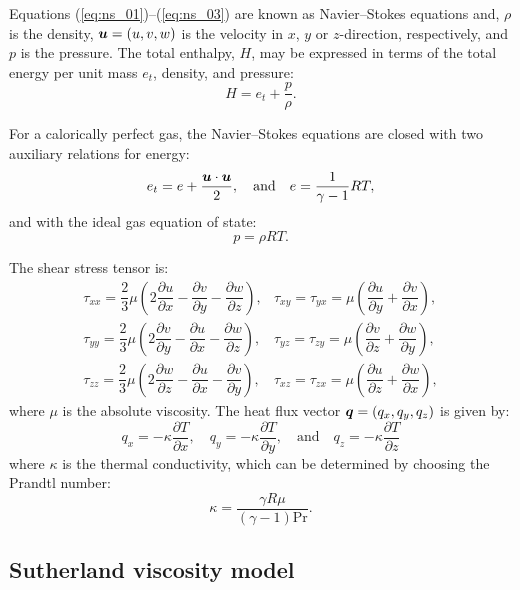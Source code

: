 \documentclass[10pt]{article}
\newcommand{\diff}[2] {\dfrac{\partial #1}{\partial #2}}
\newcommand{\bv}[1]{\ensuremath{\mbox{\boldmath$ #1 $}}}
\begin{document}
Equations (\ref{eq:ns_01})--(\ref{eq:ns_03}) are known as Navier--Stokes equations and, $\rho$ is the density, $\bv{u}=(u,v,w)$ is the velocity in $x$, $y$ or $z$-direction, respectively,    and $p$ is the pressure. The total enthalpy, $H$, may be expressed in terms of the total energy per unit mass $e_t$, density, and pressure:
$$H = e_t + \dfrac{p}{\rho}.$$ 

For a calorically perfect gas, the Navier--Stokes equations are closed with two auxiliary relations for energy:
\begin{equation}
 \label{eq:ns_04}
e_t= e+\dfrac{\bv{u}\cdot \bv{u}}{2},\quad\mbox{and}\quad e=\dfrac{1}{\gamma -1}RT ,
\end{equation}
and with the ideal gas equation of state:
\begin{equation}
 \label{eq:ns_05}
p=\rho RT.
\end{equation}

The shear stress tensor is:
\begin{equation*}
 \begin{array}{lll}
  \tau_{xx}= \dfrac{2}{3}  \mu \left( 2 \diff{u}{x} - \diff{v}{y} -\diff{w}{z} \right),
  &\tau_{xy}= \tau_{yx}=\mu \left( \diff{u}{y} + \diff{v}{x}\right),\\
  \tau_{yy}= \dfrac{2}{3}  \mu \left( 2 \diff{v}{y} - \diff{u}{x} -\diff{w}{z} \right),
  &\tau_{yz}= \tau_{zy}=\mu \left( \diff{v}{z} + \diff{w}{y}\right),\\
  \tau_{zz}= \dfrac{2}{3}  \mu \left( 2 \diff{w}{z} - \diff{u}{x} -\diff{v}{y} \right),
  &\tau_{xz}= \tau_{zx}=\mu \left( \diff{u}{z} + \diff{w}{x}\right),
 \end{array}
\end{equation*}
where $\mu$ is the absolute viscosity. The heat flux vector $\bv{q}=(q_x,q_y,q_z)$ is given by:
\begin{equation*}
 q_x = - \kappa  \diff{T}{x}, \quad q_y = - \kappa  \diff{T}{y}, \quad \mbox{and} \quad q_z = - \kappa  \diff{T}{z}
 \end{equation*}
where $\kappa $ is the thermal conductivity, which can be determined by choosing the Prandtl number:
$$\kappa = \dfrac{\gamma R \mu}{ (\gamma-1) \text{Pr}}.$$



\subsection{Sutherland viscosity model}
\end{document}
